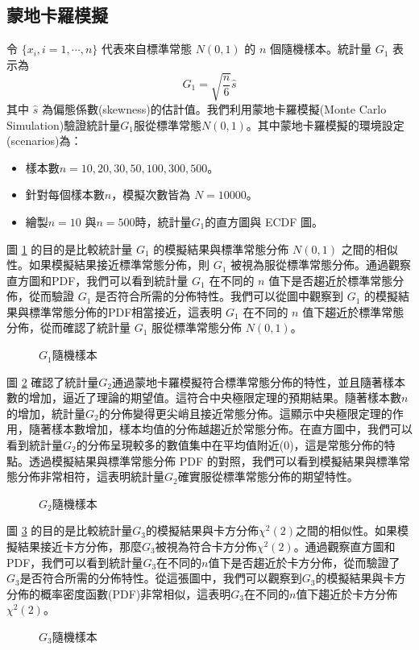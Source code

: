 \documentclass[12pt, a4paper]{article}
\begin{document}
\subsection{蒙地卡羅模擬}
令 $\{x_i, i=1,\cdots, n\}$ 代表來自標準常態 $N(0,1)$ 的 $n$ 個隨機樣本。統計量 $G_1$ 表示為
$$G_1 = \sqrt{\frac{n}{6}} \hat{s}$$
其中 $\hat{s}$ 為偏態係數(skewness)的估計值。我們利用蒙地卡羅模擬(Monte Carlo Simulation)驗證統計量$G_1$服從標準常態$N(0,1)$。其中蒙地卡羅模擬的環境設定(scenarios)為：
\begin{itemize}
\item 樣本數$n=10,20,30,50,100,300,500$。
\item 針對每個樣本數$n$，模擬次數皆為 $N=10000$。
\item 繪製$n=10$ 與$n=500$時，統計量$G_1$的直方圖與 ECDF 圖。
\end{itemize}
圖 \ref{fig:sampling-distribution_G1} 的目的是比較統計量 $G_1$ 的模擬結果與標準常態分佈 $N(0,1)$ 之間的相似性。如果模擬結果接近標準常態分佈，則 $G_1$ 被視為服從標準常態分佈。通過觀察直方圖和PDF，我們可以看到統計量 $G_1$ 在不同的 $n$ 值下是否趨近於標準常態分佈，從而驗證 $G_1$ 是否符合所需的分佈特性。我們可以從圖中觀察到 $G_1$ 的模擬結果與標準常態分佈的PDF相當接近，這表明 $G_1$ 在不同的 $n$ 值下趨近於標準常態分佈，從而確認了統計量 $G_1$ 服從標準常態分佈 $N(0,1)$。
\begin{figure}[h]
    \caption{$G_1$隨機樣本}
    \label{fig:sampling-distribution_G1}
\end{figure}

圖 \ref{fig:sampling-distribution_G2} 確認了統計量$G_2$通過蒙地卡羅模擬符合標準常態分佈的特性，並且隨著樣本數的增加，逼近了理論的期望值。這符合中央極限定理的預期結果。隨著樣本數$n$的增加，統計量$G_2$的分佈變得更尖峭且接近常態分佈。這顯示中央極限定理的作用，隨著樣本數增加，樣本均值的分佈越趨近於常態分佈。在直方圖中，我們可以看到統計量$G_2$的分佈呈現較多的數值集中在平均值附近(0)，這是常態分佈的特點。透過模擬結果與標準常態分佈 PDF 的對照，我們可以看到模擬結果與標準常態分佈非常相符，這表明統計量$G_2$確實服從標準常態分佈的期望特性。
\begin{figure}[h]
    \caption{$G_2$隨機樣本}
    \label{fig:sampling-distribution_G2}
\end{figure}




圖 \ref{fig:sampling-distribution_G3} 的目的是比較統計量$G_3$的模擬結果與卡方分佈$\chi ^2(2)$之間的相似性。如果模擬結果接近卡方分佈，那麼$G_3$被視為符合卡方分佈$\chi ^2(2)$。通過觀察直方圖和PDF，我們可以看到統計量$G_3$在不同的$n$值下是否趨近於卡方分佈，從而驗證了$G_3$是否符合所需的分佈特性。從這張圖中，我們可以觀察到$G_3$的模擬結果與卡方分佈的概率密度函數(PDF)非常相似，這表明$G_3$在不同的$n$值下趨近於卡方分佈$\chi ^2(2)$。
\begin{figure}[h]
    \caption{$G_3$隨機樣本}
    \label{fig:sampling-distribution_G3}
\end{figure}
\end{document}
